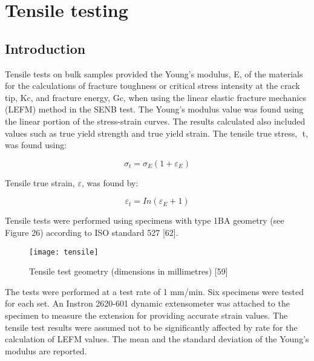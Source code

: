 \documentclass[numbers=noendperiod,chapterprefix=on]{icldt} %
\begin{document}
\section{Tensile testing}
\subsection{Introduction}
Tensile tests on bulk samples provided the Young’s modulus, E, of the materials for the calculations of fracture toughness or critical stress intensity at the crack tip, Kc, and fracture energy, Gc, when using the linear elastic fracture mechanics (LEFM) method in the SENB test. The Young’s modulus value was found using the linear portion of the stress-strain curves. The results calculated also included values such as true yield strength and true yield strain. 
The tensile true stress, t, was found using: 

\begin{equation} 
\sigma_t= \sigma_E (1+\varepsilon_E)
\end{equation}

Tensile true strain, $\varepsilon$, was found by:

\begin{equation} 
\varepsilon_t=In(\varepsilon_E+1)
\end{equation}

Tensile tests were performed using specimens with type 1BA geometry (see Figure 26) according to ISO standard 527 [62]. 

\begin{figure}[!htpb]
\centering
\texttt{[image: tensile]}
\caption{Tensile test geometry (dimensions in millimetres) [59]} %
\end{figure}

The tests were performed at a test rate of 1 mm/min. Six specimens were tested for each set. An Instron 2620-601 dynamic extensometer was attached to the specimen to measure the extension for providing accurate strain values. The tensile test results were assumed not to be significantly affected by rate for the calculation of LEFM values. The mean and the standard deviation of the Young’s modulus are reported.
\end{document}
